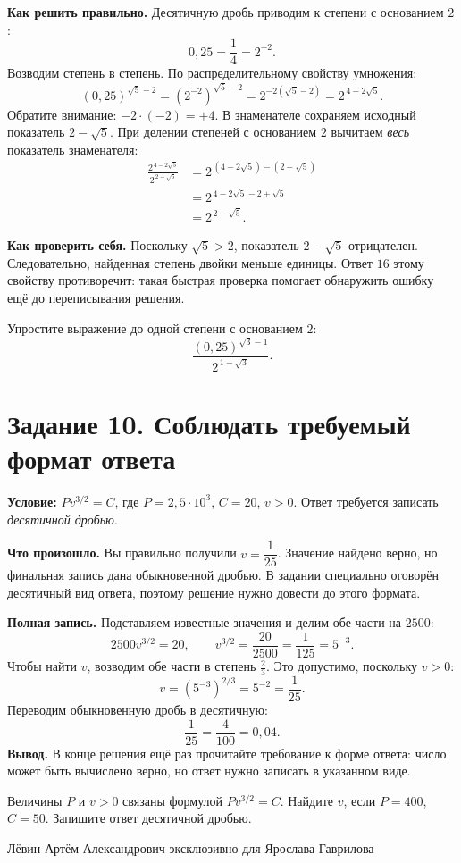 \documentclass[12pt,a4paper]{article}
\newcommand{\Step}[1]{\par\textbf{#1}\quad}
\begin{document}
\Step{Как решить правильно.} Десятичную дробь приводим к степени с основанием \(2\):
\[
0{,}25=\frac14=2^{-2}.
\]
Возводим степень в степень. По распределительному свойству умножения:
\[
(0{,}25)^{\sqrt5-2}
=(2^{-2})^{\sqrt5-2}
=2^{-2(\sqrt5-2)}
=2^{\,4-2\sqrt5}.
\]
Обратите внимание: \(-2\cdot(-2)=+4\). В знаменателе сохраняем исходный показатель \(2-\sqrt5\). При делении степеней с основанием \(2\) вычитаем \emph{весь} показатель знаменателя:
\begin{align*}
\frac{2^{\,4-2\sqrt5}}{2^{\,2-\sqrt5}}
&=2^{\,(4-2\sqrt5)-(2-\sqrt5)}\\
&=2^{\,4-2\sqrt5-2+\sqrt5}\\
&=\boxed{2^{\,2-\sqrt5}}.
\end{align*}
\Step{Как проверить себя.} Поскольку \(\sqrt5>2\), показатель \(2-\sqrt5\) отрицателен. Следовательно, найденная степень двойки меньше единицы. Ответ \(16\) этому свойству противоречит: такая быстрая проверка помогает обнаружить ошибку ещё до переписывания решения.
\begin{practice}
Упростите выражение до одной степени с основанием \(2\):
\[
\frac{(0{,}25)^{\sqrt3-1}}{2^{\,1-\sqrt3}}.
\]
\end{practice}

\clearpage
\section*{Задание 10. Соблюдать требуемый формат ответа}
\textbf{Условие:} \(Pv^{3/2}=C\), где \(P=2{,}5\cdot10^3\), \(C=20\), \(v>0\). Ответ требуется записать \emph{десятичной дробью}.

\Step{Что произошло.} Вы правильно получили \(v=\dfrac1{25}\). Значение найдено верно, но финальная запись дана обыкновенной дробью. В задании специально оговорён десятичный вид ответа, поэтому решение нужно довести до этого формата.

\Step{Полная запись.} Подставляем известные значения и делим обе части на \(2500\):
\[
2500v^{3/2}=20,
\qquad v^{3/2}=\frac{20}{2500}=\frac1{125}=5^{-3}.
\]
Чтобы найти \(v\), возводим обе части в степень \(\frac23\). Это допустимо, поскольку \(v>0\):
\[
v=\left(5^{-3}\right)^{2/3}=5^{-2}=\frac1{25}.
\]
Переводим обыкновенную дробь в десятичную:
\[
\frac1{25}=\frac4{100}=\boxed{0{,}04}.
\]
\textbf{Вывод.} В конце решения ещё раз прочитайте требование к форме ответа: число может быть вычислено верно, но ответ нужно записать в указанном виде.
\begin{practice}
Величины \(P\) и \(v>0\) связаны формулой \(Pv^{3/2}=C\). Найдите \(v\), если \(P=400\), \(C=50\). Запишите ответ десятичной дробью.
\end{practice}

\vfill
\begin{center}
\footnotesize\color{muted}Лёвин Артём Александрович эксклюзивно для Ярослава Гаврилова
\end{center}
\end{document}
